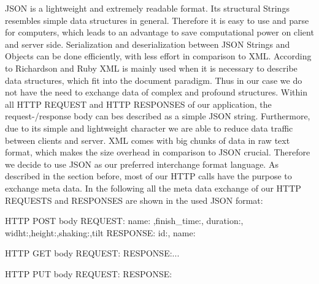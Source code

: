 \documentclass[conference]{IEEEtran}
\begin{document}
JSON is a lightweight and extremely readable format. Its structural Strings resembles simple data structures in general. Therefore it is easy to use and parse for computers, which leads to an advantage to save 
computational power on client and server side. Serialization and deserialization between JSON Strings and Objects can be done efficiently, with less effort in comparison to XML. 
According to Richardson and Ruby XML is mainly used when it is necessary to describe data structures, which fit into the document paradigm. 
Thus in our case we do not have the need to exchange data of complex and profound structures. Within all HTTP REQUEST and HTTP RESPONSES of our application, the request-/response body can bes described as a simple JSON string.
Furthermore, due to its simple and lightweight character we are able to reduce data traffic between clients and server. XML comes with big chunks of data in raw text format, which makes the size overhead in comparison to JSON crucial.
Therefore we decide to use JSON as our preferred interchange format language. As described in the section before, most of our HTTP calls have the purpose to exchange meta data. 
In the following all the meta data exchange of our HTTP REQUESTS and RESPONSES are shown in the used JSON format:

HTTP POST body	REQUEST: {name: ,finish\_time:, duration:, widht:,height:,shaking:,tilt}
				RESPONSE: {id:, name:}

HTTP GET body	REQUEST: {}
				RESPONSE:{...}

HTTP PUT body 	REQUEST: {}
				RESPONSE: {}
\end{document}
